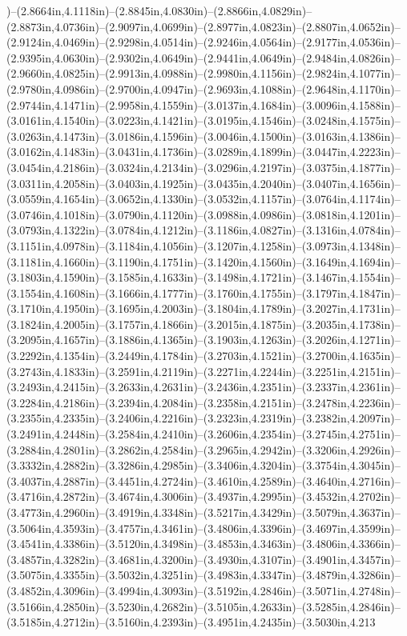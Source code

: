)--(2.8664in,4.1118in)--(2.8845in,4.0830in)--(2.8866in,4.0829in)--(2.8873in,4.0736in)--(2.9097in,4.0699in)--(2.8977in,4.0823in)--(2.8807in,4.0652in)--(2.9124in,4.0469in)--(2.9298in,4.0514in)--(2.9246in,4.0564in)--(2.9177in,4.0536in)--(2.9395in,4.0630in)--(2.9302in,4.0649in)--(2.9441in,4.0649in)--(2.9484in,4.0826in)--(2.9660in,4.0825in)--(2.9913in,4.0988in)--(2.9980in,4.1156in)--(2.9824in,4.1077in)--(2.9780in,4.0986in)--(2.9700in,4.0947in)--(2.9693in,4.1088in)--(2.9648in,4.1170in)--(2.9744in,4.1471in)--(2.9958in,4.1559in)--(3.0137in,4.1684in)--(3.0096in,4.1588in)--(3.0161in,4.1540in)--(3.0223in,4.1421in)--(3.0195in,4.1546in)--(3.0248in,4.1575in)--(3.0263in,4.1473in)--(3.0186in,4.1596in)--(3.0046in,4.1500in)--(3.0163in,4.1386in)--(3.0162in,4.1483in)--(3.0431in,4.1736in)--(3.0289in,4.1899in)--(3.0447in,4.2223in)--(3.0454in,4.2186in)--(3.0324in,4.2134in)--(3.0296in,4.2197in)--(3.0375in,4.1877in)--(3.0311in,4.2058in)--(3.0403in,4.1925in)--(3.0435in,4.2040in)--(3.0407in,4.1656in)--(3.0559in,4.1654in)--(3.0652in,4.1330in)--(3.0532in,4.1157in)--(3.0764in,4.1174in)--(3.0746in,4.1018in)--(3.0790in,4.1120in)--(3.0988in,4.0986in)--(3.0818in,4.1201in)--(3.0793in,4.1322in)--(3.0784in,4.1212in)--(3.1186in,4.0827in)--(3.1316in,4.0784in)--(3.1151in,4.0978in)--(3.1184in,4.1056in)--(3.1207in,4.1258in)--(3.0973in,4.1348in)--(3.1181in,4.1660in)--(3.1190in,4.1751in)--(3.1420in,4.1560in)--(3.1649in,4.1694in)--(3.1803in,4.1590in)--(3.1585in,4.1633in)--(3.1498in,4.1721in)--(3.1467in,4.1554in)--(3.1554in,4.1608in)--(3.1666in,4.1777in)--(3.1760in,4.1755in)--(3.1797in,4.1847in)--(3.1710in,4.1950in)--(3.1695in,4.2003in)--(3.1804in,4.1789in)--(3.2027in,4.1731in)--(3.1824in,4.2005in)--(3.1757in,4.1866in)--(3.2015in,4.1875in)--(3.2035in,4.1738in)--(3.2095in,4.1657in)--(3.1886in,4.1365in)--(3.1903in,4.1263in)--(3.2026in,4.1271in)--(3.2292in,4.1354in)--(3.2449in,4.1784in)--(3.2703in,4.1521in)--(3.2700in,4.1635in)--(3.2743in,4.1833in)--(3.2591in,4.2119in)--(3.2271in,4.2244in)--(3.2251in,4.2151in)--(3.2493in,4.2415in)--(3.2633in,4.2631in)--(3.2436in,4.2351in)--(3.2337in,4.2361in)--(3.2284in,4.2186in)--(3.2394in,4.2084in)--(3.2358in,4.2151in)--(3.2478in,4.2236in)--(3.2355in,4.2335in)--(3.2406in,4.2216in)--(3.2323in,4.2319in)--(3.2382in,4.2097in)--(3.2491in,4.2448in)--(3.2584in,4.2410in)--(3.2606in,4.2354in)--(3.2745in,4.2751in)--(3.2884in,4.2801in)--(3.2862in,4.2584in)--(3.2965in,4.2942in)--(3.3206in,4.2926in)--(3.3332in,4.2882in)--(3.3286in,4.2985in)--(3.3406in,4.3204in)--(3.3754in,4.3045in)--(3.4037in,4.2887in)--(3.4451in,4.2724in)--(3.4610in,4.2589in)--(3.4640in,4.2716in)--(3.4716in,4.2872in)--(3.4674in,4.3006in)--(3.4937in,4.2995in)--(3.4532in,4.2702in)--(3.4773in,4.2960in)--(3.4919in,4.3348in)--(3.5217in,4.3429in)--(3.5079in,4.3637in)--(3.5064in,4.3593in)--(3.4757in,4.3461in)--(3.4806in,4.3396in)--(3.4697in,4.3599in)--(3.4541in,4.3386in)--(3.5120in,4.3498in)--(3.4853in,4.3463in)--(3.4806in,4.3366in)--(3.4857in,4.3282in)--(3.4681in,4.3200in)--(3.4930in,4.3107in)--(3.4901in,4.3457in)--(3.5075in,4.3355in)--(3.5032in,4.3251in)--(3.4983in,4.3347in)--(3.4879in,4.3286in)--(3.4852in,4.3096in)--(3.4994in,4.3093in)--(3.5192in,4.2846in)--(3.5071in,4.2748in)--(3.5166in,4.2850in)--(3.5230in,4.2682in)--(3.5105in,4.2633in)--(3.5285in,4.2846in)--(3.5185in,4.2712in)--(3.5160in,4.2393in)--(3.4951in,4.2435in)--(3.5030in,4.213